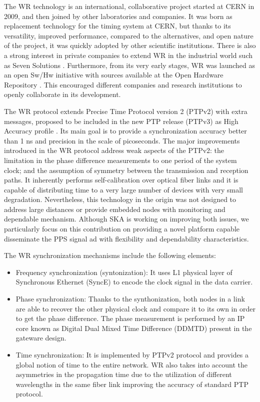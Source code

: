 The WR technology \cite{Wlostowski2011} is an international, collaborative project started at CERN in 2009, and then joined by other laboratories and companies. It was born as replacement technology for the timing system at CERN, but thanks to its versatility, improved performance, compared to the alternatives, and open nature of the project, it was quickly adopted by other scientific institutions. There is also a strong interest in private companies to extend WR in the industrial world such as Seven Solutions \cite{sevensols:wr}. Furthermore, from its very early stages, WR was launched as an open Sw/Hw initiative with sources available at the Open Hardware Repository \cite{ohwr:repo}. This encouraged different companies and research institutions to openly collaborate in its development.

The WR protocol extends Precise Time Protocol version 2 (PTPv2) with extra messages, proposed to be included in the new PTP release (PTPv3) as High Accuracy profile \cite{wr:maciej-ptpv3-standard}
. Its main goal is to provide a synchronization accuracy better than 1 ns and precision in the scale of picoseconds. The major improvements introduced in the WR protocol address weak aspects of the PTPv2: the limitation in the phase difference measurements to one period of the system clock; and the assumption of symmetry between the transmission and reception paths. It inherently performs self-calibration over optical fiber links and it is capable of distributing time to a very large number of devices with very small degradation. Nevertheless, this technology in the origin was not designed to address large distances or provide embedded nodes with monitoring and dependable mechanism. Although SKA is working on improving both issues, we particularly focus on this contribution on providing a novel platform capable disseminate the PPS signal ad with flexibility and dependability characteristics.  

The WR synchronization mechanisms include the following elements:

\begin{itemize}
	\item {Frequency synchronization (syntonization): It uses L1 physical layer of Synchronous Ethernet (SyncE) to encode the clock signal in the data 
	carrier. }
	\item {Phase synchronization: Thanks to the synthonization, both nodes in a link are able to recover the other physical clock and compare it to its own in order to get the phase difference. The phase measurement is performed by an IP core known as Digital Dual Mixed Time Difference (DDMTD) present in the gateware design.}
	\item {Time synchronization: It is implemented by PTPv2 protocol and provides a global notion of time to the entire network. WR also takes into account the asymmetries in the propagation time due to the utilization of different wavelengths in the same fiber link improving the accuracy of standard PTP protocol.}
\end{itemize}

